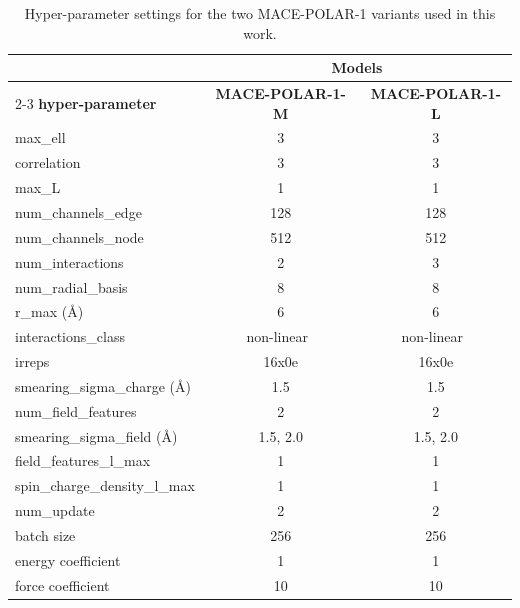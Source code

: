 \documentclass[aps,%
superscriptaddress,
 amsmath,amssymb,
floatfix,
twocolumn
]{revtex4-2}
\newcommand{\MFP}{MACE-POLAR-1 }
\newcommand{\MFPM}{MACE-POLAR-1-M }
\newcommand{\MFPL}{MACE-POLAR-1-L }
\begin{document}
\begin{table}[h]
\centering
\caption{Hyper-parameter settings for the two \MFP variants used in this work.}
\label{tab:mace_hparams}
{
\setlength{\tabcolsep}{6pt}
\renewcommand{\arraystretch}{1.15}
\begin{tabular}{@{}lcc@{}}
\toprule
& \multicolumn{2}{c}{\textbf{Models}} \\
\cmidrule(lr){2-3}
\textbf{hyper-parameter} & \textbf{\MFPM} & \textbf{\MFPL} \\
\midrule
max\_ell                & 3   & 3   \\
correlation             & 3   & 3   \\
max\_L                  & 1   & 1   \\
num\_channels\_edge      & 128 & 128 \\
num\_channels\_node      & 512 & 512 \\
num\_interactions       & 2   & 3   \\
num\_radial\_basis       & 8   & 8   \\
r\_max (\AA)            & 6   & 6   \\
interactions\_class     & non-linear~\cite{batatia2025crosslearningelectronicstructure} & non-linear~\cite{batatia2025crosslearningelectronicstructure} \\
irreps                  & 16x0e & 16x0e \\
smearing\_sigma\_charge (\AA)        &   1.5   &   1.5  \\
num\_field\_features     &  2   &   2 \\
smearing\_sigma\_field (\AA)        &   1.5, 2.0   &   1.5, 2.0  \\
field\_features\_l\_max  &   1  &   1  \\
spin\_charge\_density\_l\_max &  1   &  1   \\
num\_update             & 2 & 2 \\
batch size              & 256 & 256 \\
energy coefficient      & 1   & 1   \\
force coefficient       & 10  & 10  \\
\bottomrule
\end{tabular}}
\end{table}
\end{document}
